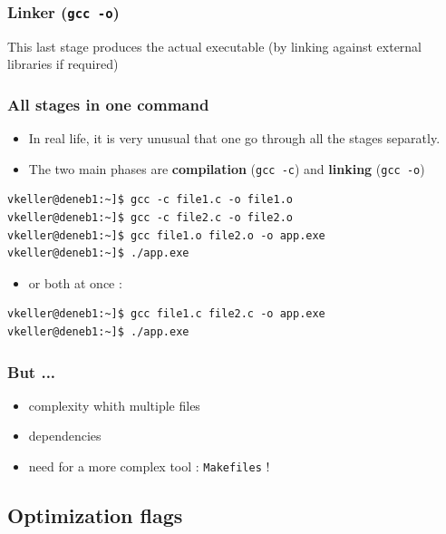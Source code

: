 \begin{frame}[containsverbatim]
\frametitle{Linker ({\tt gcc -o})}
\begin{alertblock}{}
This last stage produces the actual executable (by linking against external libraries if required)
\end{alertblock}
\end{frame}


\begin{frame}[containsverbatim]
\frametitle{All stages in one command}

\begin{itemize}
	\item In real life, it is very unusual that one go through all the stages separatly.
	\item The two main phases are {\bf compilation} ({\tt gcc -c}) and {\bf linking} ({\tt gcc -o})
\end{itemize}

\begin{verbatim}
vkeller@deneb1:~]$ gcc -c file1.c -o file1.o
vkeller@deneb1:~]$ gcc -c file2.c -o file2.o
vkeller@deneb1:~]$ gcc file1.o file2.o -o app.exe
vkeller@deneb1:~]$ ./app.exe
\end{verbatim}

\begin{itemize}
	\item or both at once :
\end{itemize}

\begin{verbatim}
vkeller@deneb1:~]$ gcc file1.c file2.c -o app.exe
vkeller@deneb1:~]$ ./app.exe
\end{verbatim}
\end{frame}

\begin{frame}
\frametitle{But ...}

\begin{itemize}
	\item complexity whith multiple files
	\item dependencies
	\item need for a more complex tool : {\tt Makefiles} !
\end{itemize}
\end{frame}
\subsection{Optimization flags}


